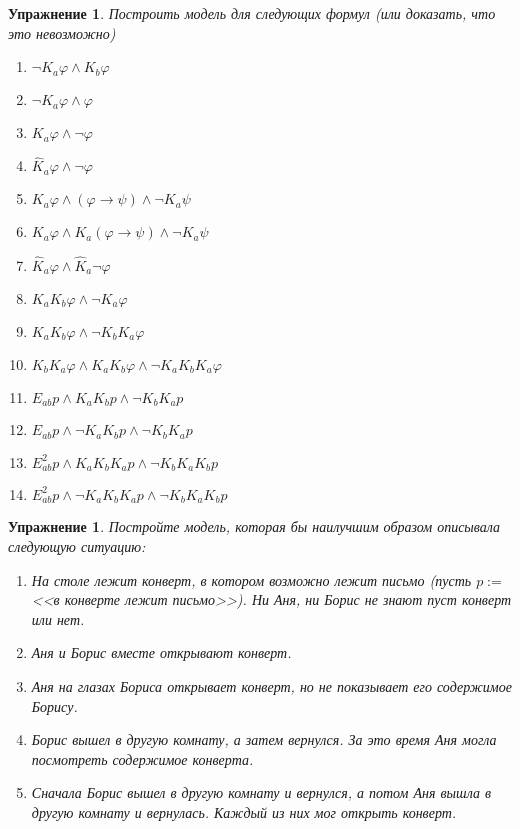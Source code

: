 \documentclass[11pt]{article}
\newtheorem{exercise}[theorem]{Упражнение}
\begin{document}
\begin{exercise} Построить модель для следующих формул (или доказать, что это невозможно)
\begin{multicols}{2}
\begin{enumerate}
	\item $\neg K_a \varphi  \wedge K_b \varphi $
	\item   $\neg K_a \varphi  \wedge \varphi $ 
	\item $ K_a \varphi  \wedge \neg \varphi $
	\item  $ \hat{K}_a \varphi  \wedge \neg \varphi $
	\item $K_a \varphi  \wedge  ( \varphi \to \psi)  \wedge \neg K_a \psi $
	\item $K_a \varphi  \wedge  K_a ( \varphi \to \psi)  \wedge \neg K_a\psi $ 
	\item $ \hat{K}_a \varphi  \wedge \hat{K}_a \neg \varphi  $
	\item $ K_a K_b \varphi \wedge \neg K_a \varphi$
	\item $ K_a K_b \varphi  \wedge \neg  K_b K_a \varphi  $
	\item $ K_b K_a \varphi  \wedge K_a K_b \varphi \wedge   \neg K_a K_b  K_a \varphi  $ 
	\item $E_{ab}p \wedge K_a K_b p \wedge \neg K_b K_a p$	
\item $E_{ab}p \wedge \neg K_a K_b p \wedge \neg K_b K_a p$
\item $E^2_{ab}p \wedge K_a K_b K_a p \wedge \neg K_b K_a K_b p $
\item $E^2_{ab}p \wedge \neg K_a K_b K_a p \wedge \neg K_b K_a K_b p $
\end{enumerate}
\end{multicols}
\end{exercise}

\begin{exercise} \label{Letter} Постройте модель, которая бы наилучшим образом описывала следующую ситуацию:
\begin{enumerate} 
\item  На столе лежит конверт, в котором возможно лежит письмо (пусть $p:=$ <<в конверте лежит письмо>>). Ни Аня, ни Борис не знают пуст конверт или нет.
\item Аня и Борис вместе открывают конверт.
\item Аня на глазах Бориса открывает конверт, но не показывает его содержимое Борису.
\item Борис вышел в другую комнату, а затем вернулся. За это время Аня могла посмотреть содержимое конверта.
\item Сначала Борис вышел в другую комнату и вернулся, а потом Аня вышла в другую комнату и вернулась. Каждый из них мог открыть конверт. \label{LetterCube}
\end{enumerate}
\end{exercise} 
\end{document}
